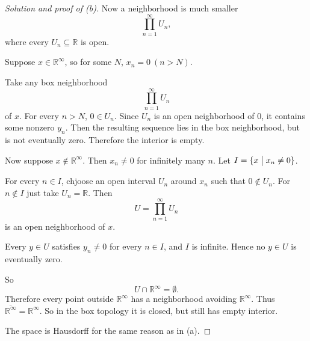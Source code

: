 \begin{proof}[Solution and proof of (b)]
    Now a neighborhood is much smaller 
    \[
        \prod_{n=1}^\infty U_n, 
    \]
    where every $U_n \subseteq \mathbb R$ is open. 

    Suppose $x \in \mathbb R^\infty$, so for 
    some $N$, $x_n = 0 \ (n > N)$. 
    
    Take any box neighborhood 
    \[
        \prod_{n=1}^\infty U_n 
    \]
    of $x$. 
    For every $n > N$, $0 \in U_n$. 
    Since $U_n$ is an open neighborhood of $0$, it contains 
    some nonzero $y_n$. Then the resulting sequence 
    lies in the box neighborhood, but is not eventually 
    zero. 
    Therefore the interior is empty. 

    Now suppose $x \not\in \mathbb R^\infty$. Then 
    $x_n \neq 0$ for infinitely many $n$. 
    Let $I = \{x \bigm| x_n \neq 0\}$. 

    For every $n \in I$, chjoose an open interval 
    $U_n$ around $x_n$ such that $0 \not\in U_n$. 
    For $n \not\in I$ just take $U_n = \mathbb R$. 
    Then 
    \[
        U = \prod_{n=1}^\infty U_n 
    \]
    is an open neighborhood of $x$. 

    Every $y \in U$ satisfies $y_n \neq 0$ for every 
    $n \in I$, and $I$ is infinite. Hence no 
    $y \in U$ is eventually zero. 

    So 
    \[
        U \cap \mathbb R^\infty = \emptyset. 
    \]
    Therefore every point outside $\mathbb R^\infty$ 
    has a neighborhood avoiding $\mathbb R^\infty$. 
    Thus $\overline{\mathbb R^\infty} = \mathbb R^\infty$. 
    So in the box topology it is closed, but still 
    has empty interior. 

    The space is Hausdorff for the same reason as in 
    (a). 
\end{proof}

